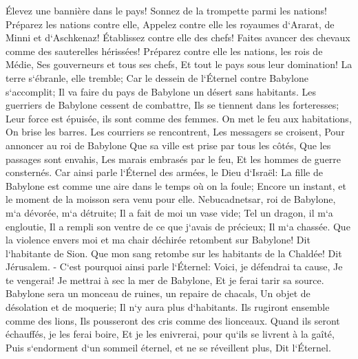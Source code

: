 \verse Élevez une bannière dans le pays! Sonnez de la trompette parmi les nations! Préparez les nations contre elle, Appelez contre elle les royaumes d`Ararat, de Minni et d`Aschkenaz! Établissez contre elle des chefs! Faites avancer des chevaux comme des sauterelles hérissées! 
\verse Préparez contre elle les nations, les rois de Médie, Ses gouverneurs et tous ses chefs, Et tout le pays sous leur domination! 
\verse La terre s`ébranle, elle tremble; Car le dessein de l`Éternel contre Babylone s`accomplit; Il va faire du pays de Babylone un désert sans habitants. 
\verse Les guerriers de Babylone cessent de combattre, Ils se tiennent dans les forteresses; Leur force est épuisée, ils sont comme des femmes. On met le feu aux habitations, On brise les barres. 
\verse Les courriers se rencontrent, Les messagers se croisent, Pour annoncer au roi de Babylone Que sa ville est prise par tous les côtés, 
\verse Que les passages sont envahis, Les marais embrasés par le feu, Et les hommes de guerre consternés. 
\verse Car ainsi parle l`Éternel des armées, le Dieu d`Israël: La fille de Babylone est comme une aire dans le temps où on la foule; Encore un instant, et le moment de la moisson sera venu pour elle. 
\verse Nebucadnetsar, roi de Babylone, m`a dévorée, m`a détruite; Il a fait de moi un vase vide; Tel un dragon, il m`a engloutie, Il a rempli son ventre de ce que j`avais de précieux; Il m`a chassée. 
\verse Que la violence envers moi et ma chair déchirée retombent sur Babylone! Dit l`habitante de Sion. Que mon sang retombe sur les habitants de la Chaldée! Dit Jérusalem. - 
\verse C`est pourquoi ainsi parle l`Éternel: Voici, je défendrai ta cause, Je te vengerai! Je mettrai à sec la mer de Babylone, Et je ferai tarir sa source. 
\verse Babylone sera un monceau de ruines, un repaire de chacals, Un objet de désolation et de moquerie; Il n`y aura plus d`habitants. 
\verse Ils rugiront ensemble comme des lions, Ils pousseront des cris comme des lionceaux. 
\verse Quand ils seront échauffés, je les ferai boire, Et je les enivrerai, pour qu`ils se livrent à la gaîté, Puis s`endorment d`un sommeil éternel, et ne se réveillent plus, Dit l`Éternel. 
